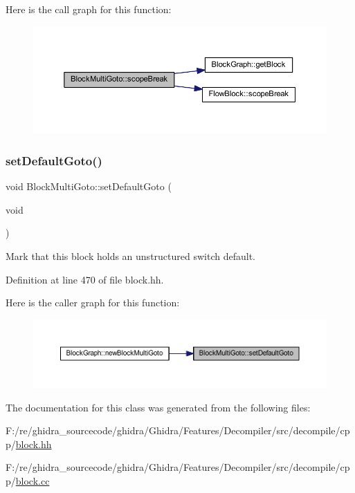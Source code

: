 Here is the call graph for this function\+:
\nopagebreak
\begin{figure}[H]
\begin{center}
\leavevmode
\includegraphics[width=350pt]{class_block_multi_goto_a1957286b0a3a4a2d280caae3c1f19cc7_cgraph}
\end{center}
\end{figure}
\mbox{\label{class_block_multi_goto_adda142d9e4fa3d02adfbf887cc4c17f6}} 
\subsubsection{\texorpdfstring{setDefaultGoto()}{setDefaultGoto()}}
{\footnotesize\ttfamily void Block\+Multi\+Goto\+::set\+Default\+Goto (\begin{DoxyParamCaption}\item[{void}]{ }\end{DoxyParamCaption})\hspace{0.3cm}{\ttfamily [inline]}}



Mark that this block holds an unstructured switch default. 



Definition at line 470 of file block.\+hh.

Here is the caller graph for this function\+:
\nopagebreak
\begin{figure}[H]
\begin{center}
\leavevmode
\includegraphics[width=350pt]{class_block_multi_goto_adda142d9e4fa3d02adfbf887cc4c17f6_icgraph}
\end{center}
\end{figure}


The documentation for this class was generated from the following files\+:\begin{DoxyCompactItemize}
\item 
F\+:/re/ghidra\+\_\+sourcecode/ghidra/\+Ghidra/\+Features/\+Decompiler/src/decompile/cpp/\mbox{\hyperlink{block_8hh}{block.\+hh}}\item 
F\+:/re/ghidra\+\_\+sourcecode/ghidra/\+Ghidra/\+Features/\+Decompiler/src/decompile/cpp/\mbox{\hyperlink{block_8cc}{block.\+cc}}\end{DoxyCompactItemize}
